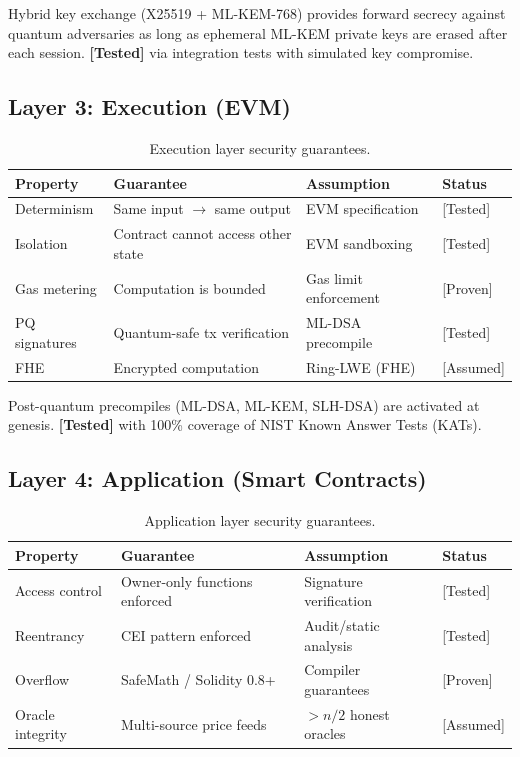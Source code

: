 \documentclass[11pt,a4paper]{article}
\begin{document}
Hybrid key exchange (X25519 + ML-KEM-768) provides forward secrecy against quantum
adversaries as long as ephemeral ML-KEM private keys are erased after each session.
\textbf{[Tested]} via integration tests with simulated key compromise.

\subsection{Layer 3: Execution (EVM)}

\begin{table}[ht]
\centering
\caption{Execution layer security guarantees.}
\label{tab:execution-security}
\begin{tabular}{llll}
\toprule
\textbf{Property} & \textbf{Guarantee} & \textbf{Assumption} & \textbf{Status} \\
\midrule
Determinism & Same input $\to$ same output & EVM specification & [Tested] \\
Isolation & Contract cannot access other state & EVM sandboxing & [Tested] \\
Gas metering & Computation is bounded & Gas limit enforcement & [Proven] \\
PQ signatures & Quantum-safe tx verification & ML-DSA precompile & [Tested] \\
FHE & Encrypted computation & Ring-LWE (FHE) & [Assumed] \\
\bottomrule
\end{tabular}
\end{table}

Post-quantum precompiles (ML-DSA, ML-KEM, SLH-DSA) are activated at genesis.
\textbf{[Tested]} with 100\% coverage of NIST Known Answer Tests (KATs).

\subsection{Layer 4: Application (Smart Contracts)}

\begin{table}[ht]
\centering
\caption{Application layer security guarantees.}
\label{tab:application-security}
\begin{tabular}{llll}
\toprule
\textbf{Property} & \textbf{Guarantee} & \textbf{Assumption} & \textbf{Status} \\
\midrule
Access control & Owner-only functions enforced & Signature verification & [Tested] \\
Reentrancy & CEI pattern enforced & Audit/static analysis & [Tested] \\
Overflow & SafeMath / Solidity 0.8+ & Compiler guarantees & [Proven] \\
Oracle integrity & Multi-source price feeds & $> n/2$ honest oracles & [Assumed] \\
\bottomrule
\end{tabular}
\end{table}
\end{document}
